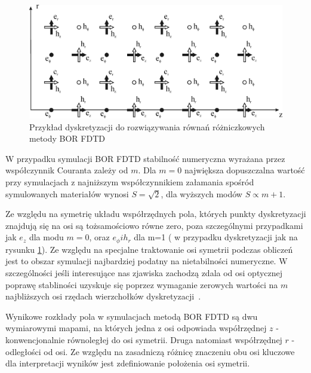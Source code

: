 \begin{figure}
	\includegraphics[width=\textwidth]{subart/fdtd/R5_TFSF.png}
	\caption{Przykład dyskretyzacji do rozwiązywania równań różniczkowych metody BOR FDTD \cite{antosiewicz2009wplyw}}
	\label{fig:bor-dysk}
\end{figure}
W przypadku symulacji BOR FDTD stabilność numeryczna wyrażana przez współczynnik Couranta zależy od $m$. Dla $m=0$ największa dopuszczalna wartość przy symulacjach z najniższym współczynnikiem załamania spośród symulowanych materiałów wynosi $S=\sqrt{2}$, dla wyższych modów $S \propto m+1$. 

Ze względu na symetrię układu współrzędnych pola, których punkty dyskretyzacji znajdują się na osi są tożsamościowo równe zero, poza szczególnymi przypadkami jak $e_z$ dla modu $m=0$, oraz $e_{\phi} i h_r$ dla m=1 ( w przypadku dyskretyzacji jak na rysunku \ref{fig:bor-dysk}). Ze względu na specjalne traktowanie osi symetrii podczas obliczeń jest to obszar symulacji najbardziej podatny na nietabilności numeryczne. W szczególności jeśli interesujące nas zjawiska zachodzą zdala od osi optycznej poprawę stabliności uzyskuje się poprzez wymaganie zerowych wartości na $m$ najbliższych osi rzędach wierzchołków dyskretyzacji~\cite{OskooiRo10}.

Wynikowe rozkłady pola w symulacjach metodą BOR FDTD są dwu wymiarowymi mapami, na których jedna z osi odpowiada współrzędnej $z$ - konwencjonalnie równoległej do osi symetrii. Druga natomiast współrzędnej $r$ - odległości od osi. Ze względu na zasadniczą różnicę znaczeniu obu osi kluczowe dla interpretacji wyników jest zdefiniowanie położenia osi symetrii.


